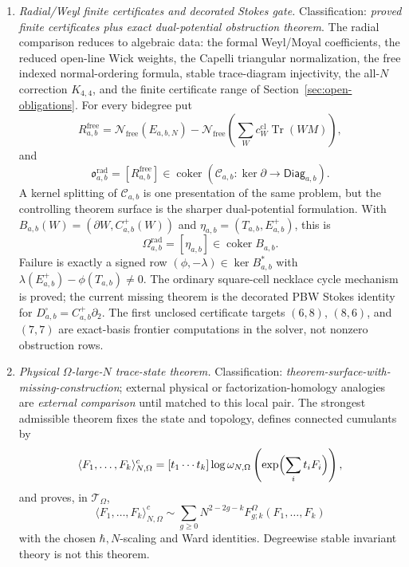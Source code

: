 \begin{enumerate}
  \item \emph{Radial/Weyl finite certificates and decorated Stokes gate.}
  Classification: \emph{proved finite certificates plus exact
  dual-potential obstruction theorem}.  The radial comparison reduces
  to algebraic data: the formal Weyl/Moyal coefficients, the reduced
  open-line Wick weights, the Capelli triangular normalization, the
  free indexed normal-ordering formula, stable trace-diagram
  injectivity, the all-\(N\) correction \(K_{4,4}\), and the finite
  certificate range of Section~\ref{sec:open-obligations}.  For every bidegree put
  \[
    R^{\mathrm{free}}_{a,b}
    =
    \mathcal N_{\mathrm{free}}(E_{a,b,N})
    -
    \mathcal N_{\mathrm{free}}
    \left(\sum_W c^{\mathrm{cl}}_W\operatorname{Tr}(WM)\right),
  \]
  and
  \[
    \mathfrak o^{\mathrm{rad}}_{a,b}
    =
    [R^{\mathrm{free}}_{a,b}]
    \in
    \operatorname{coker}
    \left(
      \mathcal C_{a,b}\colon
      \ker\partial\to\mathsf{Diag}_{a,b}
    \right).
  \]
  A kernel splitting of \(\mathcal C_{a,b}\) is one presentation of the
  same problem, but the controlling theorem surface is the sharper
  dual-potential formulation.  With
  \(B_{a,b}(W)=(\partial W,C^+_{a,b}(W))\) and
  \(\eta_{a,b}=(T_{a,b},E^+_{a,b})\), this is
  \[
    \Omega^{\mathrm{rad}}_{a,b}
      =
    [\eta_{a,b}]\in\operatorname{coker}B_{a,b}.
  \]
  Failure is exactly a signed row
  \((\phi,-\lambda)\in\ker B_{a,b}^*\) with
  \(\lambda(E^+_{a,b})-\phi(T_{a,b})\ne0\).  The ordinary square-cell
  necklace cycle mechanism is proved; the current missing theorem is the
  decorated PBW Stokes identity for
  \(D^\square_{a,b}=C^+_{a,b}\partial_2\).  The first unclosed
  certificate targets \((6,8)\), \((8,6)\), and \((7,7)\) are exact-basis
  frontier computations in the solver, not nonzero obstruction rows.

  \item \emph{Physical \(\Omega\)-large-\(N\) trace-state theorem.}
  Classification: \emph{theorem-surface-with-missing-construction};
  external physical or factorization-homology analogies are
  \emph{external comparison} until matched to this local pair.  The
  strongest admissible theorem fixes the state and topology, defines
  connected cumulants by
  \[
    \langle F_1,\ldots,F_k\rangle^c_{N,\Omega}
    =
    [t_1\cdots t_k]\log\omega_{N,\Omega}
    \left(\exp\Bigl(\sum_i t_iF_i\Bigr)\right),
  \]
  and proves, in \(\mathcal T_\Omega\),
  \[
    \langle F_1,\ldots,F_k\rangle^c_{N,\Omega}
    \sim
    \sum_{g\ge0}N^{2-2g-k}
    F^\Omega_{g;k}(F_1,\ldots,F_k)
  \]
  with the chosen \(\hbar,N\)-scaling and Ward identities.  Degreewise
  stable invariant theory is not this theorem.
\end{enumerate}

